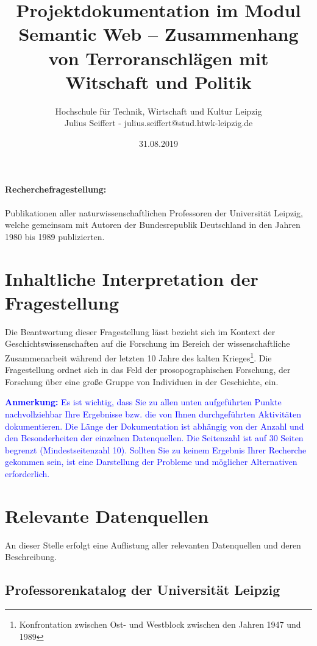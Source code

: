 \documentclass[a4paper,10pt,parskip]{article}
\title{Projektdokumentation im Modul Semantic Web -- Zusammenhang von Terroranschlägen mit Witschaft und Politik}
\author{Hochschule für Technik, Wirtschaft und Kultur Leipzig\\Julius Seiffert - julius.seiffert@stud.htwk-leipzig.de}
\date{31.08.2019}
\begin{document}
\maketitle


\paragraph{Recherchefragestellung: }
Publikationen aller naturwissenschaftlichen Professoren der Universität Leipzig, welche gemeinsam mit Autoren der Bundesrepublik Deutschland in den Jahren 1980 bis 1989 publizierten.


\section{Inhaltliche Interpretation der Fragestellung}

Die Beantwortung dieser Fragestellung lässt bezieht sich im Kontext der Geschichtswissenschaften auf die Forschung im Bereich der wissenschaftliche Zusammenarbeit während der letzten 10 Jahre des kalten Krieges\footnote{Konfrontation zwischen Ost- und Westblock zwischen den Jahren 1947 und 1989}. Die Fragestellung ordnet sich in das Feld der prosopographischen Forschung, der Forschung über eine große Gruppe von Individuen in der Geschichte, ein.

\vspace{0.5cm}\textcolor{blue}{\textbf{Anmerkung:} Es ist wichtig, dass Sie zu allen unten aufgeführten Punkte nachvollziehbar Ihre Ergebnisse bzw. die von Ihnen durchgeführten Aktivitäten dokumentieren. Die Länge der Dokumentation ist abhängig von der Anzahl und den Besonderheiten der einzelnen Datenquellen. Die Seitenzahl ist auf 30 Seiten begrenzt (Mindestseitenzahl 10). Sollten Sie zu keinem Ergebnis Ihrer Recherche gekommen sein, ist eine Darstellung der Probleme und möglicher Alternativen erforderlich.}

\section{Relevante Datenquellen}

An dieser Stelle erfolgt eine Auflistung aller relevanten Datenquellen und deren Beschreibung.

\subsection{Professorenkatalog der Universität Leipzig}
\end{document}
